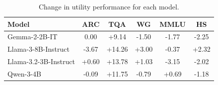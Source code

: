 \begin{table}[htbp]
    \centering
    \setlength{\tabcolsep}{2pt}
    \renewcommand{\arraystretch}{0.9}
    \small
    \caption{Change in utility performance for each model.}
    \label{tab:utility_diff}
    

    \begin{tabular}{l ccccc}
        \toprule
        \textbf{Model} & \textbf{ARC} & \textbf{TQA} & \textbf{WG} & \textbf{MMLU} & \textbf{HS} \\
        \midrule
        Gemma-2-2B-IT & 0.00 & +9.14 & -1.50 & -1.77 & -2.25 \\
        Llama-3-8B-Instruct & -3.67 & +14.26 & +3.00 & -0.37 & +2.32  \\
        Llama-3.2-3B-Instruct & +0.60  & +13.78  & +1.03  & -3.15 & -2.02   \\
        Qwen-3-4B & -0.09 & +11.75 & -0.79 & +0.69 & -1.18  \\
        \bottomrule
    \end{tabular}
\end{table}